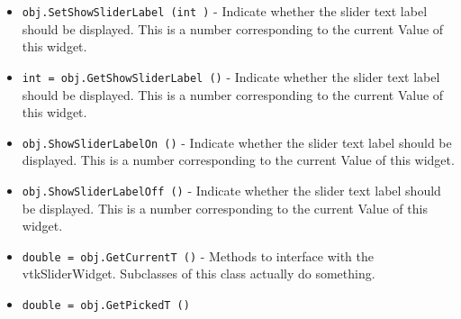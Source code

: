 \begin{itemize}
\item  \verb|obj.SetShowSliderLabel (int )| -  Indicate whether the slider text label should be displayed. This is
 a number corresponding to the current Value of this widget.

\item  \verb|int = obj.GetShowSliderLabel ()| -  Indicate whether the slider text label should be displayed. This is
 a number corresponding to the current Value of this widget.

\item  \verb|obj.ShowSliderLabelOn ()| -  Indicate whether the slider text label should be displayed. This is
 a number corresponding to the current Value of this widget.

\item  \verb|obj.ShowSliderLabelOff ()| -  Indicate whether the slider text label should be displayed. This is
 a number corresponding to the current Value of this widget.

\item  \verb|double = obj.GetCurrentT ()| -  Methods to interface with the vtkSliderWidget. Subclasses of this class 
 actually do something.

\item  \verb|double = obj.GetPickedT ()|

\end{itemize}
